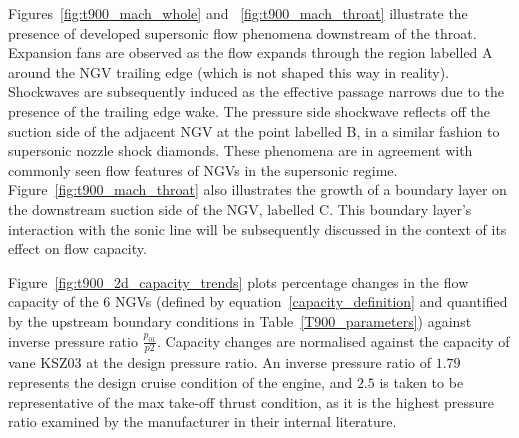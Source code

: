 \documentclass[a4paper, 11pt, oneside]{report}
\begin{document}
Figures~\ref{fig:t900_mach_whole} and ~\ref{fig:t900_mach_throat} illustrate the presence of developed supersonic flow phenomena downstream of the throat. Expansion fans are observed as the flow expands through the region labelled A around the NGV trailing edge (which is not shaped this way in reality). Shockwaves are subsequently induced as the effective passage narrows due to the presence of the trailing edge wake. The pressure side shockwave reflects off the suction side of the adjacent NGV at the point labelled B, in a similar fashion to supersonic nozzle shock diamonds. These phenomena are in agreement with commonly seen flow features of NGVs in the supersonic regime. Figure~\ref{fig:t900_mach_throat} also illustrates the growth of a boundary layer on the downstream suction side of the NGV, labelled C. This boundary layer's interaction with the sonic line will be subsequently discussed in the context of its effect on flow capacity.

Figure~\ref{fig:t900_2d_capacity_trends} plots percentage changes in the flow capacity of the 6 NGVs (defined by equation~\ref{capacity_definition} and quantified by the upstream boundary conditions in Table~\ref{T900_parameters}) against inverse pressure ratio $\frac{p_{01}}{p2}$. Capacity changes are normalised against the capacity of vane KSZ03 at the design pressure ratio. An inverse pressure ratio of $1.79$ represents the design cruise condition of the engine, and $2.5$ is taken to be representative of the max take-off thrust condition, as it is the highest pressure ratio examined by the manufacturer in their internal literature.
\end{document}
